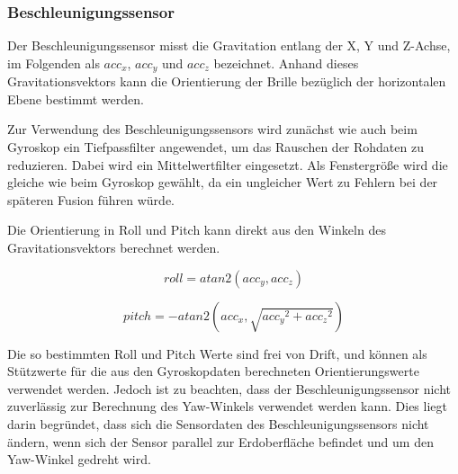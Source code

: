 

\subsubsection{Beschleunigungssensor}


Der Beschleunigungssensor misst die Gravitation entlang der X, Y und Z-Achse, im Folgenden als $acc_x$, $acc_y$ und $acc_z$ bezeichnet.
Anhand dieses Gravitationsvektors kann die Orientierung der Brille bezüglich der horizontalen Ebene bestimmt werden.

Zur Verwendung des Beschleunigungssensors wird zunächst wie auch beim
Gyroskop ein Tiefpassfilter angewendet, um das Rauschen der Rohdaten zu
reduzieren.
Dabei wird ein Mittelwertfilter eingesetzt.
Als Fenstergröße wird die gleiche wie beim Gyroskop gewählt, da ein ungleicher Wert zu Fehlern bei der späteren Fusion
führen würde. 


Die Orientierung in Roll und Pitch kann direkt aus den Winkeln des Gravitationsvektors berechnet werden.

\begin{equation}
    roll = atan2(acc_y, acc_z)
\end{equation}

\begin{equation}
    pitch = -atan2(acc_x, \sqrt{ {acc_y}^2 + {acc_z}^2 })
\end{equation}

Die so bestimmten Roll und Pitch Werte sind frei von Drift, und können als Stützwerte für die aus den Gyroskopdaten berechneten Orientierungswerte verwendet werden.
Jedoch ist zu beachten, dass der Beschleunigungssensor nicht zuverlässig zur Berechnung des Yaw-Winkels verwendet werden kann.
Dies liegt darin begründet, dass sich die Sensordaten des Beschleunigungssensors nicht ändern, wenn sich der Sensor parallel zur Erdoberfläche befindet und um den Yaw-Winkel gedreht wird.





